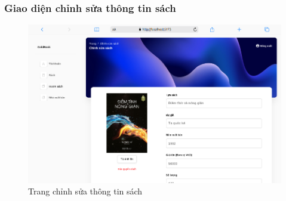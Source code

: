 \subsubsection{Giao diện chỉnh sửa thông tin sách}
\begin{figure}[H]
  \centering
  \includegraphics[width=1\textwidth]{report/images/admin/sach_detail.png}
  \caption{Trang chỉnh sửa thông tin sách}
\end{figure}
 